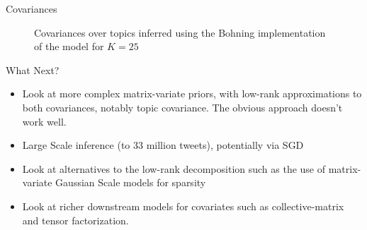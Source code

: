 \documentclass[xcolor=dvipsnames]{beamer}
\begin{document}

\begin{frame}{Covariances}

\begin{figure}
\centering     %
{}
\caption{Covariances over topics inferred using the Bohning implementation of the model for $K = 25$}
\end{figure}

\end{frame}



\begin{frame}{What Next?}

\begin{itemize}
    \item Look at more complex matrix-variate priors, with low-rank approximations to both covariances, notably topic covariance. The obvious approach doesn't work well.
    \item Large Scale inference (to 33 million tweets), potentially via SGD\cite{Hoffman2012}    
    \item Look at alternatives to the low-rank decomposition such as the use of matrix-variate Gaussian Scale models for sparsity\cite{Yang2013}
    \item Look at richer downstream models for covariates such as collective-matrix\cite{Singh} and tensor factorization\cite{Xiong}.
\end{itemize}

\end{frame}
\end{document}
